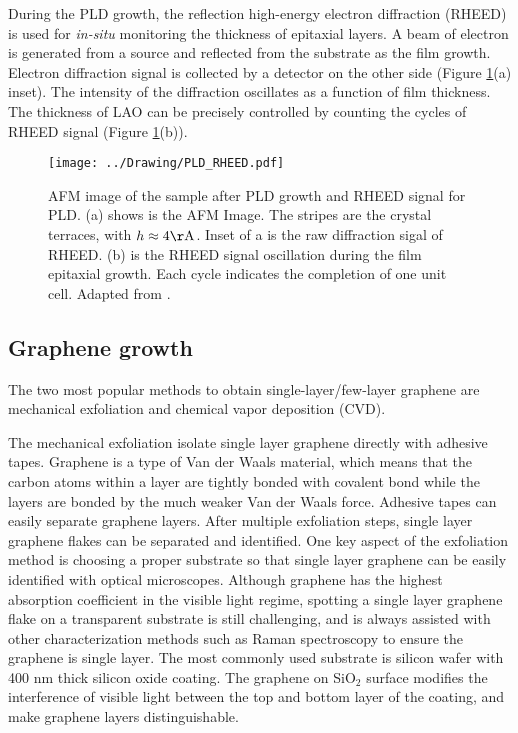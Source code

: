 \documentclass[pdftex, sectionletters]{pittetd}    %
\begin{document}
During the PLD growth, the reflection high-energy electron diffraction (RHEED) is used for \emph{in-situ} monitoring the thickness of epitaxial layers. A beam of electron is generated from a source and reflected from the substrate as the film growth. Electron diffraction signal is collected by a detector on the other side (Figure \ref{FIG:RHEED}(a) inset). The intensity of the diffraction oscillates as a function of film thickness. The thickness of LAO can be precisely controlled by counting the cycles of RHEED signal (Figure \ref{FIG:RHEED}(b)).

\begin{figure}[hp!]
	\centering
	\texttt{[image: ../Drawing/PLD\_RHEED.pdf]}
	\caption{AFM image of the sample after PLD growth and RHEED signal for PLD. (a) shows is the AFM Image. The stripes are the crystal terraces, with $h \approx 4 \mathrm{\AA}$. Inset of a is the raw diffraction sigal of RHEED. (b) is the RHEED signal oscillation during the film epitaxial growth. Each cycle indicates the completion of one unit cell. Adapted from \cite{podkaminer2016real}.}
	\label{FIG:RHEED}
\end{figure}


\subsection{Graphene growth}

The two most popular methods to obtain single-layer/few-layer graphene are mechanical exfoliation and chemical vapor deposition (CVD). 

The mechanical exfoliation isolate single layer graphene directly with adhesive tapes. Graphene is a type of Van der Waals material, which means that the carbon atoms within a layer are tightly bonded with covalent bond while the layers are bonded by the much weaker Van der Waals force. Adhesive tapes can easily separate graphene layers. After multiple exfoliation steps, single layer graphene flakes can be separated and identified\cite{}. One key aspect of the exfoliation method is choosing a proper substrate so that single layer graphene can be easily identified with optical microscopes. Although graphene has the highest absorption coefficient in the visible light regime\cite{}, spotting a single layer graphene flake on a transparent substrate is still challenging, and is always assisted with other characterization methods such as Raman spectroscopy\cite{} to ensure the graphene is single layer. The most commonly used substrate is silicon wafer with 400 nm thick silicon oxide coating. The graphene on SiO$_2$ surface modifies the interference of visible light between the top and bottom layer of the coating, and make graphene layers distinguishable\cite{}. 
\end{document}
